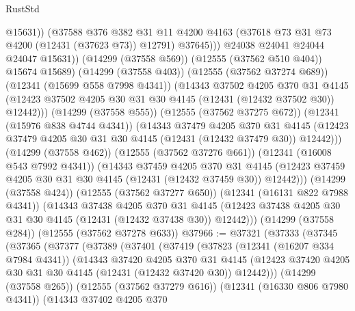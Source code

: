 \begin{lexlean}{RustStd}
\begin{coremodule}
                          @15631))
                      (@37588
                        @376
                        @382
                        @31
                        @11
                        @4200
                        @4163
                        (@37618 @73 @31 @73 @4200 (@12431 (@37623 @73)) @12791)
                        @37645)))
                  @24038
                  @24041
                  @24044
                  @24047
                  @15631))
              (@14299 (@37558 @569))
              (@12555 (@37562 @510 @404))
              @15674
              @15689)
            (@14299 (@37558 @403))
            (@12555 (@37562 @37274 @689))
            (@12341 (@15699 @558 @7998 @4341))
            (@14343
              @37502
              @4205
              @370
              @31
              @4145
              (@12423 @37502 @4205 @30 @31 @30 @4145 (@12431 (@12432 @37502 @30)) @12442)))
          (@14299 (@37558 @555))
          (@12555 (@37562 @37275 @672))
          (@12341 (@15976 @838 @4744 @4341))
          (@14343
            @37479
            @4205
            @370
            @31
            @4145
            (@12423 @37479 @4205 @30 @31 @30 @4145 (@12431 (@12432 @37479 @30)) @12442)))
        (@14299 (@37558 @462))
        (@12555 (@37562 @37276 @661))
        (@12341 (@16008 @543 @7992 @4341))
        (@14343
          @37459
          @4205
          @370
          @31
          @4145
          (@12423 @37459 @4205 @30 @31 @30 @4145 (@12431 (@12432 @37459 @30)) @12442)))
      (@14299 (@37558 @424))
      (@12555 (@37562 @37277 @650))
      (@12341 (@16131 @822 @7988 @4341))
      (@14343
        @37438
        @4205
        @370
        @31
        @4145
        (@12423 @37438 @4205 @30 @31 @30 @4145 (@12431 (@12432 @37438 @30)) @12442)))
    (@14299 (@37558 @284))
    (@12555 (@37562 @37278 @633))
@37966 := @37321
    (@37333
      (@37345
        (@37365
          (@37377
            (@37389
              (@37401
                (@37419
                  (@37823
                    (@12341 (@16207 @334 @7984 @4341))
                    (@14343
                      @37420
                      @4205
                      @370
                      @31
                      @4145
                      (@12423 @37420 @4205 @30 @31 @30 @4145 (@12431 (@12432 @37420 @30)) @12442)))
                  (@14299 (@37558 @265))
                  (@12555 (@37562 @37279 @616))
                  (@12341 (@16330 @806 @7980 @4341))
                  (@14343
                    @37402
                    @4205
                    @370

\end{coremodule}
\end{lexlean}
